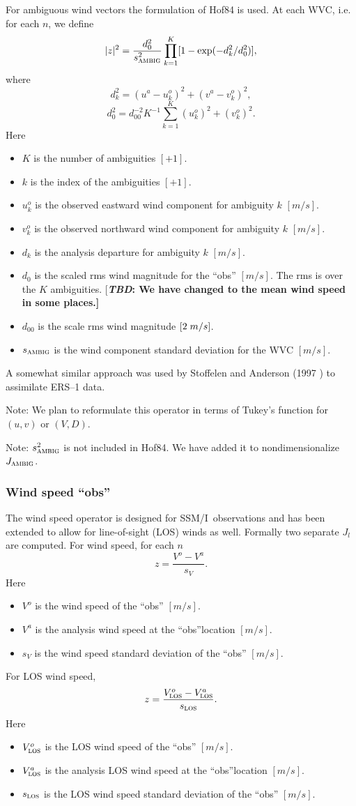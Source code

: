 \documentclass[11pt]{article}
\newcommand{\ers}[1]{ERS--{#1}}
\newcommand{\Jm}[1]{\mbox{$ J_{\mbox{\tiny #1}} $}}
\newcommand{\J}[1]{\mbox{$ J_{#1} $}}
\newcommand{\mks}[2]{\mbox{$ {#1} \; {#2} $}}
\newcommand{\obs}{``obs''}
\newcommand{\ssmi}{SSM/I}
\newcommand{\xxxx}[1]{\subsubsection {#1}}
\newcommand{\TBD}[1]{{[\bfseries{\itshape{TBD: }{{#1}}}]}}
\newcommand{\reference}[2]{(#1 \cite{#2})}
\newcommand{\eql}[2]{\begin{equation} \label{eq:#1} #2 \end{equation}}
\newcommand{\COMMENT}[2]{{[\bfseries {\itshape #1}: {#2}]}}
\renewcommand{\TBD}[1]{\COMMENT{TBD}{{#1}}}
\newcommand{\vardef}[3]{\item $ {#1} $ is the {#2} $ [{#3}] $. }
\newcommand{\subsc}[2]{\mbox{$ #1_{\mbox{\sc \footnotesize #2}} $}}
\renewcommand{\Jm}[1]{\subsc{J}{{#1}}}
\begin{document}
For ambiguous wind vectors the formulation of Hof84 is used.  At each
WVC, i.e. for each $n$, we define
 \eql{zsass}{ |z|^2 = \frac{d^2_0}{\subsc{s^2}{ambig}}
   \prod_{k=1}^{K}[1-\exp(-d_k^2/d_0^2)] , }
 where
 \eql{dk}{ d_k^2 = (u^a - u^o_k)^2 + (v^a - v^o_k)^2 , }
 \eql{d0}{ d_0^2 = d_{00}^{-2} K^{-1} \sum_{k=1}^{K} (u^o_k)^2 + (v^o_k)^2 . }
 Here \begin{itemize}
  \vardef{K}{number of ambiguities}{+1}
  \vardef{k}{index of the ambiguities}{+1}
  \vardef{u^o_k}{observed eastward wind component for ambiguity $k$}{m/s}
  \vardef{v^o_k}{observed northward wind component for ambiguity $k$}{m/s}
  \vardef{d_k}{analysis departure for ambiguity $k$}{m/s}
  \vardef{d_0}{scaled rms wind magnitude for the \obs}{m/s}
   The rms is over the $K$ ambiguities.
   \TBD{We have changed to the mean wind speed in some places.}
  \vardef{d_{00}}{scale rms wind magnitude}{\mks{2}{m/s}}
  \vardef{\subsc{s}{ambig}}{wind component standard deviation for the WVC}{m/s}
 \end{itemize} 

A somewhat similar approach was used by Stoffelen and Anderson
\reference{1997}{StoA97b} to assimilate \ers1 data.

Note: We plan to reformulate this operator in terms of Tukey's
function for $(u,v)$ or $(V,D)$.

Note: \subsc{s^2}{ambig} is not included in Hof84.  We have added it
to nondimensionalize \Jm{ambig}.

\xxxx {Wind speed \obs}

The wind speed operator is designed for \ssmi\ observations and has
been extended to allow for line-of-sight (LOS) winds as well.
Formally two separate \J{l} are computed.  For wind speed, for each $n$
 \eql{zspeed}{ z = \frac{V^o - V^a}{s_V} . }
 Here \begin{itemize}
  \vardef{V^o}{wind speed of the \obs}{m/s}
  \vardef{V^a}{analysis wind speed at the \obs location}{m/s}
  \vardef{s_V}{wind speed standard deviation of the \obs}{m/s}
 \end{itemize} 

For LOS wind speed,
 \eql{zlos}{ z = \frac{\subsc{V^o}{los} - \subsc{V^a}{los}}
   {\subsc{s}{los}} . }
 Here \begin{itemize}
  \vardef{\subsc{V^o}{los}}{LOS wind speed of the \obs}{m/s}
  \vardef{\subsc{V^a}{los}}{analysis LOS wind speed at the \obs location}{m/s}
  \vardef{\subsc{s}{los}}{LOS wind speed standard deviation of the \obs}{m/s}
 \end{itemize} 
\end{document}
